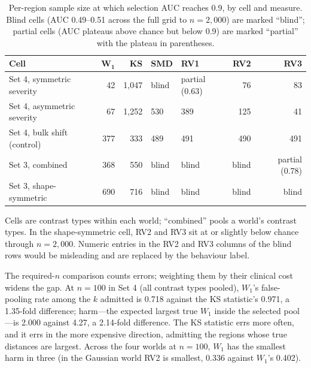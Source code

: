 \documentclass[AMA,Times1COL]{WileyNJDv5}
\begin{document}
\begin{table}[ht]
\centering
\caption{Per-region sample size at which selection AUC reaches 0.9, by cell and measure. Blind cells (AUC 0.49--0.51 across the full grid to $n = 2{,}000$) are marked ``blind''; partial cells (AUC plateaus above chance but below 0.9) are marked ``partial'' with the plateau in parentheses.\label{tab:study2_required_n}}
\begin{tabular}{lrrllrr}
\toprule
\textbf{Cell} & $\boldsymbol{W_1}$ & \textbf{KS} & \textbf{SMD} & \textbf{RV1} & \textbf{RV2} & \textbf{RV3} \\
\midrule
Set 4, symmetric severity  & 42  & 1{,}047 & blind & partial (0.63) & 76  & 83 \\
Set 4, asymmetric severity & 67  & 1{,}252 & 530   & 389            & 125 & 41 \\
Set 4, bulk shift (control) & 377 & 333    & 489   & 491            & 490 & 491 \\
Set 3, combined            & 368 & 550     & blind & blind          & blind & partial (0.78) \\
Set 3, shape-symmetric     & 690 & 716     & blind & blind          & blind & blind \\
\bottomrule
\end{tabular}
\begin{tablenotes}
\item Cells are contrast types within each world; ``combined'' pools a world's contrast types. In the shape-symmetric cell, RV2 and RV3 sit at or slightly below chance through $n = 2{,}000$. Numeric entries in the RV2 and RV3 columns of the blind rows would be misleading and are replaced by the behaviour label.
\end{tablenotes}
\end{table}

The required-$n$ comparison counts errors; weighting them by their clinical cost widens the gap. At $n = 100$ in Set 4 (all contrast types pooled), $W_1$'s false-pooling rate among the $k$ admitted is 0.718 against the KS statistic's 0.971, a 1.35-fold difference; harm---the expected largest true $W_1$ inside the selected pool---is 2.000 against 4.27, a 2.14-fold difference. The KS statistic errs more often, and it errs in the more expensive direction, admitting the regions whose true distances are largest. Across the four worlds at $n = 100$, $W_1$ has the smallest harm in three (in the Gaussian world RV2 is smallest, 0.336 against $W_1$'s 0.402).
\end{document}
